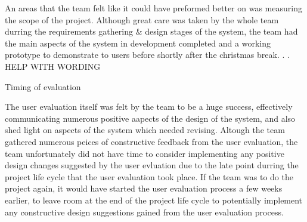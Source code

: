An areas that the team felt like it could have preformed better on was measuring the scope of the project. Although great care was taken by the whole team durring the requirements gathering & design stages of the system, the  team had the main aspects of the system in development completed and a working prototype to demonstrate to users before shortly after the christmas break. . . HELP WITH WORDING


Timing of evaluation 

The user evaluation itself was felt by the team to be a huge success, effectively communicating numerous positive aapects of the design of the system, and also shed light on aspects of the system which needed revising. Altough the team gathered numerous peices of constructive feedback from the user evaluation, the team unfortunately did not have time to consider implementing any positive design changes suggested by the user evluation due to the late point durring the project life cycle that the user evaluation took place. If the team was to do the project again, it would have started the user evaluation process a few weeks earlier, to leave room at the end of the project life cycle to potentially implement any constructive design suggestions gained from the user evaluation process.       

    


